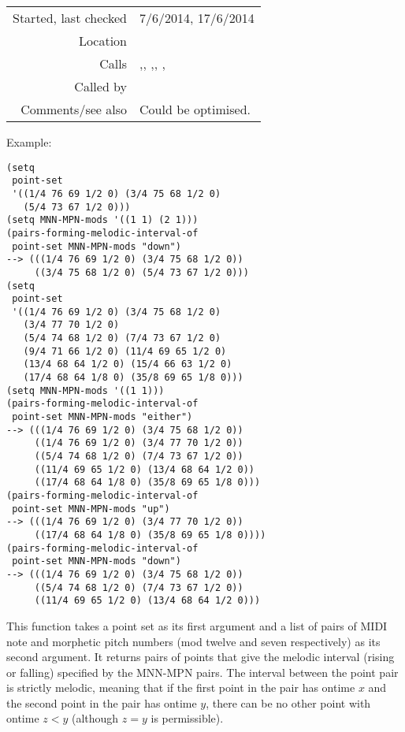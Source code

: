 \vspace{0.3cm}
\begin{tabular}{r|p{8cm}}
Started, last checked & 7/6/2014, 17/6/2014 \\
Location & \nameref{sec:pitches-intervals-durations} \\
Calls & \nameref{fun:index-1st-sublist-item>},\newline \nameref{fun:multiply-list-by-constant}, \nameref{fun:nth-list},\newline \nameref{fun:nth-list-of-lists},
\nameref{fun:restrict-dataset-in-nth-to-xs}, \nameref{fun:subtract-two-lists} \\
Called by & \nameref{fun:melodic-interval-of-a} \\
Comments/see also & Could be optimised.
\end{tabular}

\vspace{0.5cm}
\noindent Example:
\begin{verbatim}
(setq
 point-set
 '((1/4 76 69 1/2 0) (3/4 75 68 1/2 0)
   (5/4 73 67 1/2 0)))
(setq MNN-MPN-mods '((1 1) (2 1)))
(pairs-forming-melodic-interval-of
 point-set MNN-MPN-mods "down")
--> (((1/4 76 69 1/2 0) (3/4 75 68 1/2 0))
     ((3/4 75 68 1/2 0) (5/4 73 67 1/2 0)))
(setq
 point-set
 '((1/4 76 69 1/2 0) (3/4 75 68 1/2 0)
   (3/4 77 70 1/2 0)
   (5/4 74 68 1/2 0) (7/4 73 67 1/2 0)
   (9/4 71 66 1/2 0) (11/4 69 65 1/2 0)
   (13/4 68 64 1/2 0) (15/4 66 63 1/2 0)
   (17/4 68 64 1/8 0) (35/8 69 65 1/8 0)))
(setq MNN-MPN-mods '((1 1)))
(pairs-forming-melodic-interval-of
 point-set MNN-MPN-mods "either")
--> (((1/4 76 69 1/2 0) (3/4 75 68 1/2 0))
     ((1/4 76 69 1/2 0) (3/4 77 70 1/2 0))
     ((5/4 74 68 1/2 0) (7/4 73 67 1/2 0))
     ((11/4 69 65 1/2 0) (13/4 68 64 1/2 0))
     ((17/4 68 64 1/8 0) (35/8 69 65 1/8 0)))
(pairs-forming-melodic-interval-of
 point-set MNN-MPN-mods "up")
--> (((1/4 76 69 1/2 0) (3/4 77 70 1/2 0))
     ((17/4 68 64 1/8 0) (35/8 69 65 1/8 0))))
(pairs-forming-melodic-interval-of
 point-set MNN-MPN-mods "down")
--> (((1/4 76 69 1/2 0) (3/4 75 68 1/2 0))
     ((5/4 74 68 1/2 0) (7/4 73 67 1/2 0))
     ((11/4 69 65 1/2 0) (13/4 68 64 1/2 0)))
\end{verbatim}

\noindent This function takes a point set as its first
argument and a list of pairs of MIDI note and morphetic
pitch numbers (mod twelve and seven respectively) as
its second argument. It returns pairs of points that
give the melodic interval (rising or falling)
specified by the MNN-MPN pairs. The interval between
the point pair is strictly melodic, meaning that if
the first point in the pair has ontime $x$ and the
second point in the pair has ontime $y$, there can be
no other point with ontime $z < y$ (although $z = y$
is permissible).



